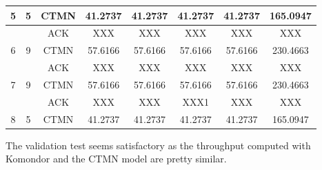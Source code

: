 \documentclass[a4paper]{article}
\begin{document}
\begin{table}[]
\begin{tabular}{|c|c|c|c|c|c|c|c|}
\multirow{-2}{*}{5}                         & \multirow{-2}{*}{5}                          & CTMN          & 41.2737    & 41.2737    & 41.2737    & 41.2737    & 165.0947   \\ \hline
                                            &                                              & ACK       & XXX    &XXX    & XXX    & XXX    & XXX   \\ \cline{3-8} 
\multirow{-2}{*}{6}                         & \multirow{-2}{*}{9}                          & CTMN          & 57.6166    & 57.6166    & 57.6166    & 57.6166    & 230.4663   \\ \hline
                                            &                                              & ACK       & XXX    & XXX    & XXX    & XXX    & XXX   \\ \cline{3-8} 
\multirow{-2}{*}{7}                         & \multirow{-2}{*}{9}                          & CTMN          & 57.6166    & 57.6166    & 57.6166    & 57.6166    & 230.4663   \\ \hline
                                            &                                              & ACK       & XXX   & XXX    &XXX1    & XXX   &XXX   \\ \cline{3-8} 
\multirow{-2}{*}{8}                         & \multirow{-2}{*}{5}                          & CTMN          & 41.2737    & 41.2737    & 41.2737    & 41.2737    & 165.0947   \\ \hline
\end{tabular}
\end{table}

The validation test seems satisfactory as the throughput computed with Komondor and the CTMN model are pretty similar.

\end{document}
